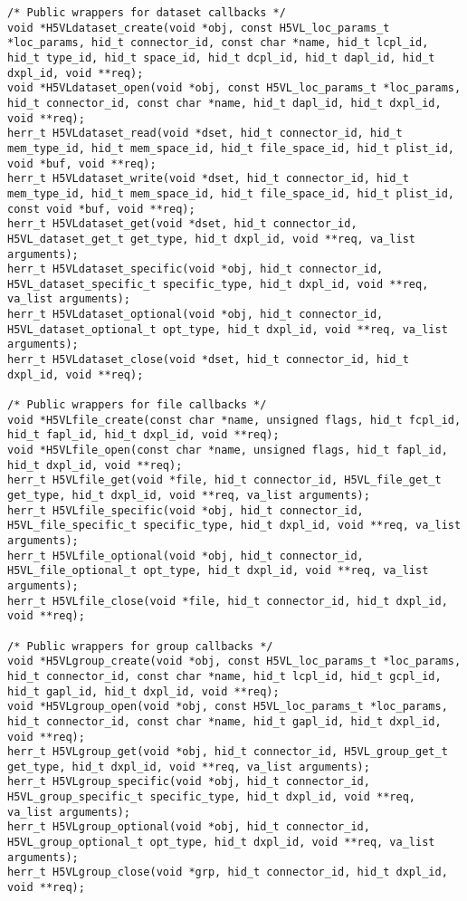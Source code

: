 \begin{appendices}
\begin{lstlisting}
/* Public wrappers for dataset callbacks */                                      
void *H5VLdataset_create(void *obj, const H5VL_loc_params_t *loc_params, hid_t connector_id, const char *name, hid_t lcpl_id, hid_t type_id, hid_t space_id, hid_t dcpl_id, hid_t dapl_id, hid_t dxpl_id, void **req);
void *H5VLdataset_open(void *obj, const H5VL_loc_params_t *loc_params, hid_t connector_id, const char *name, hid_t dapl_id, hid_t dxpl_id, void **req);
herr_t H5VLdataset_read(void *dset, hid_t connector_id, hid_t mem_type_id, hid_t mem_space_id, hid_t file_space_id, hid_t plist_id, void *buf, void **req);
herr_t H5VLdataset_write(void *dset, hid_t connector_id, hid_t mem_type_id, hid_t mem_space_id, hid_t file_space_id, hid_t plist_id, const void *buf, void **req);
herr_t H5VLdataset_get(void *dset, hid_t connector_id, H5VL_dataset_get_t get_type, hid_t dxpl_id, void **req, va_list arguments);
herr_t H5VLdataset_specific(void *obj, hid_t connector_id, H5VL_dataset_specific_t specific_type, hid_t dxpl_id, void **req, va_list arguments);
herr_t H5VLdataset_optional(void *obj, hid_t connector_id, H5VL_dataset_optional_t opt_type, hid_t dxpl_id, void **req, va_list arguments);
herr_t H5VLdataset_close(void *dset, hid_t connector_id, hid_t dxpl_id, void **req);

/* Public wrappers for file callbacks */                                         
void *H5VLfile_create(const char *name, unsigned flags, hid_t fcpl_id, hid_t fapl_id, hid_t dxpl_id, void **req);
void *H5VLfile_open(const char *name, unsigned flags, hid_t fapl_id, hid_t dxpl_id, void **req);
herr_t H5VLfile_get(void *file, hid_t connector_id, H5VL_file_get_t get_type, hid_t dxpl_id, void **req, va_list arguments);
herr_t H5VLfile_specific(void *obj, hid_t connector_id, H5VL_file_specific_t specific_type, hid_t dxpl_id, void **req, va_list arguments);
herr_t H5VLfile_optional(void *obj, hid_t connector_id, H5VL_file_optional_t opt_type, hid_t dxpl_id, void **req, va_list arguments);
herr_t H5VLfile_close(void *file, hid_t connector_id, hid_t dxpl_id, void **req);
                                                                                 
/* Public wrappers for group callbacks */                                        
void *H5VLgroup_create(void *obj, const H5VL_loc_params_t *loc_params, hid_t connector_id, const char *name, hid_t lcpl_id, hid_t gcpl_id, hid_t gapl_id, hid_t dxpl_id, void **req);
void *H5VLgroup_open(void *obj, const H5VL_loc_params_t *loc_params, hid_t connector_id, const char *name, hid_t gapl_id, hid_t dxpl_id, void **req);
herr_t H5VLgroup_get(void *obj, hid_t connector_id, H5VL_group_get_t get_type, hid_t dxpl_id, void **req, va_list arguments);
herr_t H5VLgroup_specific(void *obj, hid_t connector_id, H5VL_group_specific_t specific_type, hid_t dxpl_id, void **req, va_list arguments);
herr_t H5VLgroup_optional(void *obj, hid_t connector_id, H5VL_group_optional_t opt_type, hid_t dxpl_id, void **req, va_list arguments);
herr_t H5VLgroup_close(void *grp, hid_t connector_id, hid_t dxpl_id, void **req);


\end{lstlisting}
\end{appendices}
